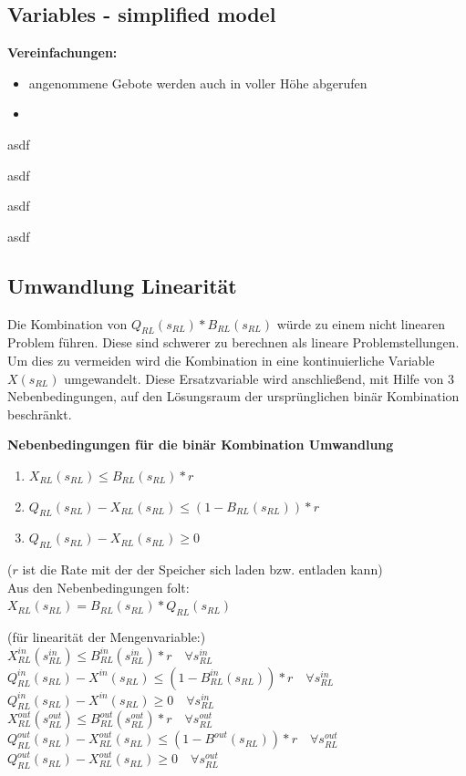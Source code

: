 \documentclass{article}
\begin{document}
\subsection{Variables - simplified model}
\textbf{Vereinfachungen:}



\begin{itemize}
    \item angenommene Gebote werden auch in voller Höhe abgerufen
    \item 
\end{itemize}

asdf


asdf


asdf


asdf
\subsection{Umwandlung Linearität}
Die Kombination von $Q_{RL}(s_{RL}) * B_{RL}(s_{RL})$ würde zu einem nicht linearen Problem führen. Diese sind schwerer zu berechnen als lineare Problemstellungen. Um dies zu vermeiden wird die Kombination in eine kontinuierliche Variable $X(s_{RL})$ umgewandelt. Diese Ersatzvariable wird anschließend, mit Hilfe von 3 Nebenbedingungen, auf den Lösungsraum der ursprünglichen binär Kombination beschränkt.

\textbf{Nebenbedingungen für die binär Kombination Umwandlung}
\begin{enumerate}
    \item $X_{RL}(s_{RL}) \leq B_{RL}(s_{RL}) * r$
    \item $Q_{RL}(s_{RL}) - X_{RL}(s_{RL}) \leq (1 - B_{RL}(s_{RL})) * r $
    \item $Q_{RL}(s_{RL}) - X_{RL}(s_{RL}) \geq 0 $
\end{enumerate}
($r$ ist die Rate mit der der Speicher sich laden bzw. entladen kann)\\
Aus den Nebenbedingungen folt:\\

$X_{RL}(s_{RL}) = B_{RL}(s_{RL}) * Q_{RL}(s_{RL}) $

(für linearität der Mengenvariable:)\\
$X^{in}_{RL}(s^{in}_{RL}) \leq B^{in}_{RL}(s^{in}_{RL}) * r \quad\forall s^{in}_{RL}$\\
$Q^{in}_{RL}(s_{RL}) - X^{in}(s_{RL}) \leq (1 - B^{in}_{RL}(s_{RL})) * r \quad\forall s^{in}_{RL}$\\
$Q^{in}_{RL}(s_{RL}) - X^{in}(s_{RL}) \geq 0 \quad\forall s^{in}_{RL}$\\
$X^{out}_{RL}(s^{out}_{RL}) \leq B^{out}_{RL}(s^{out}_{RL}) * r \quad\forall s^{out}_{RL}$\\
$Q^{out}_{RL}(s_{RL}) - X^{out}_{RL}(s_{RL}) \leq (1 - B^{out}(s_{RL})) * r \quad\forall s^{out}_{RL}$\\
$Q^{out}_{RL}(s_{RL}) - X^{out}_{RL}(s_{RL}) \geq 0\quad\forall s^{out}_{RL} $\\
\end{document}
